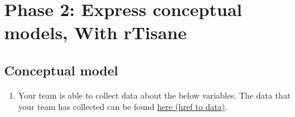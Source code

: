 \documentclass[
]{article}
\author{}
\date{\vspace{-2.5em}}
\providecommand{\tightlist}{%
  \setlength{\itemsep}{0pt}\setlength{\parskip}{0pt}}
\begin{document}
\setcounter{page}{166}

\hypertarget{conceptual-model}{%
\section{Phase 2: Express conceptual models, With rTisane}
\subsection{Conceptual model}\label{conceptual-model}}

\begin{enumerate}
\def\labelenumi{\arabic{enumi}.}
\tightlist
\item
  Your team is able to collect data about the below variables. The data
  that your team has collected can be found
  \href{https://homes.cs.washington.edu/~emjun/income_final.csv}{here (href to data)}.
\end{enumerate}
\end{document}
